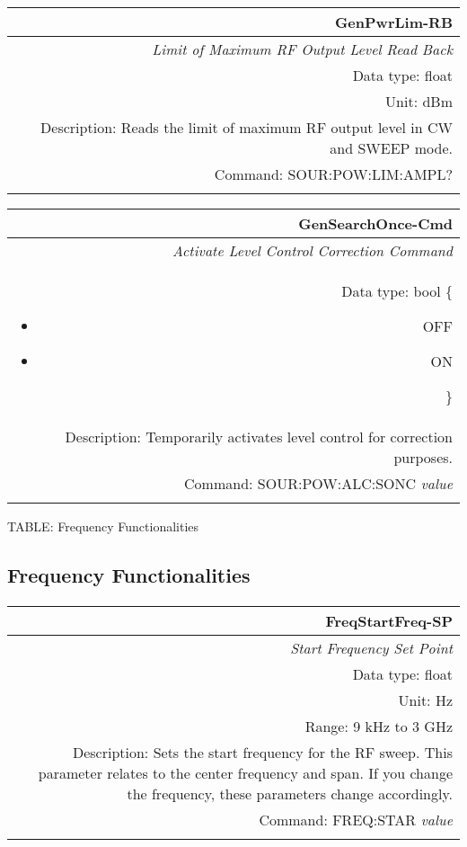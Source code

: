 \documentclass[openany]{article}
\begin{document}
		\begin{tabular}{N}
			\hline
			\bfseries GenPwrLim-RB \\ \hline
			\emph{Limit of Maximum RF Output Level Read Back} \\
			Data type: float \\
			Unit: dBm \\
			Description: Reads the limit of maximum RF output level in CW and SWEEP mode. \\
			Command: SOUR:POW:LIM:AMPL? \\
			\\

		\end{tabular}


		\begin{tabular}{N}
			\hline
			\bfseries GenSearchOnce-Cmd \\ \hline
			\emph{Activate Level Control Correction Command} \\
			Data type: bool \{\begin{itemize}[noitemsep]
				\small
				\item[] OFF
				\item[] ON
			\end{itemize}\} \\
			Description: Temporarily activates level control for correction purposes. \\
			Command: SOUR:POW:ALC:SONC \emph{value} \\
			\\

		\end{tabular}


	 TABLE: Frequency Functionalities
	\subsection{Frequency Functionalities}\label{pvgroup:function} %

	\paragraph{}

		\begin{tabular}{N}
			\hline
			\bfseries FreqStartFreq-SP \\ \hline
			\emph{Start Frequency Set Point} \\
			Data type: float \\
			Unit: Hz \\
			Range: 9 kHz to 3 GHz \\
			Description: Sets the start frequency for the RF sweep. This parameter relates to the center frequency and span. If you change the frequency, these parameters change accordingly. \\
			Command: FREQ:STAR \emph{value} \\
			\\
			
		\end{tabular}
\end{document}
